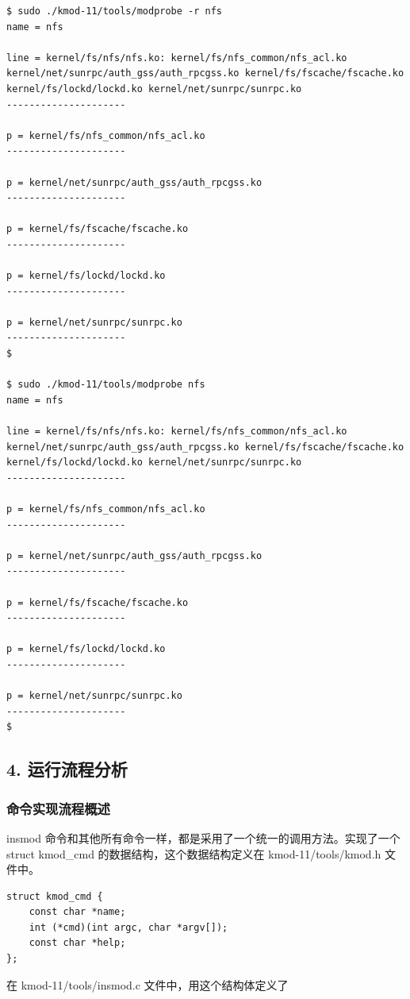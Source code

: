 \documentclass[11pt,a4paper]{article}
\begin{document}
{\begin{shaded}\begin{verbatim}
$ sudo ./kmod-11/tools/modprobe -r nfs
name = nfs

line = kernel/fs/nfs/nfs.ko: kernel/fs/nfs_common/nfs_acl.ko kernel/net/sunrpc/auth_gss/auth_rpcgss.ko kernel/fs/fscache/fscache.ko kernel/fs/lockd/lockd.ko kernel/net/sunrpc/sunrpc.ko
---------------------

p = kernel/fs/nfs_common/nfs_acl.ko
---------------------

p = kernel/net/sunrpc/auth_gss/auth_rpcgss.ko
---------------------

p = kernel/fs/fscache/fscache.ko
---------------------

p = kernel/fs/lockd/lockd.ko
---------------------

p = kernel/net/sunrpc/sunrpc.ko
---------------------
$ 

$ sudo ./kmod-11/tools/modprobe nfs
name = nfs

line = kernel/fs/nfs/nfs.ko: kernel/fs/nfs_common/nfs_acl.ko kernel/net/sunrpc/auth_gss/auth_rpcgss.ko kernel/fs/fscache/fscache.ko kernel/fs/lockd/lockd.ko kernel/net/sunrpc/sunrpc.ko
---------------------

p = kernel/fs/nfs_common/nfs_acl.ko
---------------------

p = kernel/net/sunrpc/auth_gss/auth_rpcgss.ko
---------------------

p = kernel/fs/fscache/fscache.ko
---------------------

p = kernel/fs/lockd/lockd.ko
---------------------

p = kernel/net/sunrpc/sunrpc.ko
---------------------
$ 
\end{verbatim}\end{shaded}}
\subsection{4. 运行流程分析}

\subsubsection{命令实现流程概述}

insmod 命令和其他所有命令一样，都是采用了一个统一的调用方法。实现了一个
struct kmod\_cmd 的数据结构，这个数据结构定义在 kmod-11/tools/kmod.h
文件中。

{\begin{shaded}\begin{verbatim}
struct kmod_cmd {
    const char *name;
    int (*cmd)(int argc, char *argv[]);
    const char *help;
};
\end{verbatim}\end{shaded}}
在 kmod-11/tools/insmod.c 文件中，用这个结构体定义了
\end{document}
